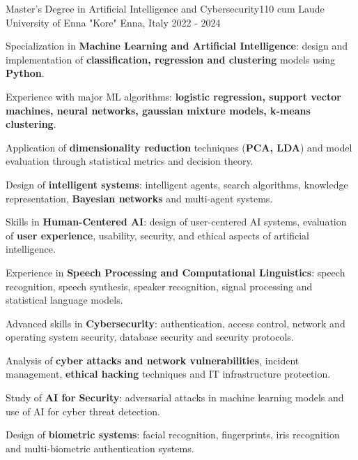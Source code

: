 
\begin{cventries}

  \cventry
    {Master's Degree in Artificial Intelligence and Cybersecurity{\enskip\cdotp\enskip}110 cum Laude}
    {University of Enna "Kore"}
    {Enna, Italy}
    {2022 - 2024}
    {
      \begin{cvitems}
        \item {Specialization in \textbf{Machine Learning and Artificial Intelligence}: design and implementation of \textbf{classification, regression and clustering} models using \textbf{Python}.}
        \item {Experience with major ML algorithms: \textbf{logistic regression, support vector machines, neural networks, gaussian mixture models, k-means clustering}.}
        \item {Application of \textbf{dimensionality reduction} techniques (\textbf{PCA, LDA}) and model evaluation through statistical metrics and decision theory.}
        \item {Design of \textbf{intelligent systems}: intelligent agents, search algorithms, knowledge representation, \textbf{Bayesian networks} and multi-agent systems.}
        \item {Skills in \textbf{Human-Centered AI}: design of user-centered AI systems, evaluation of \textbf{user experience}, usability, security, and ethical aspects of artificial intelligence.}
        \item {Experience in \textbf{Speech Processing and Computational Linguistics}: speech recognition, speech synthesis, speaker recognition, signal processing and statistical language models.}
        \item {Advanced skills in \textbf{Cybersecurity}: authentication, access control, network and operating system security, database security and security protocols.}
        \item {Analysis of \textbf{cyber attacks and network vulnerabilities}, incident management, \textbf{ethical hacking} techniques and IT infrastructure protection.}
        \item {Study of \textbf{AI for Security}: adversarial attacks in machine learning models and use of AI for cyber threat detection.}
        \item {Design of \textbf{biometric systems}: facial recognition, fingerprints, iris recognition and multi-biometric authentication systems.}
      \end{cvitems}
    }


\end{cventries}
